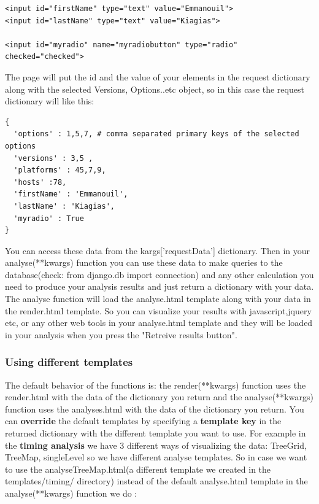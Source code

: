 \documentclass{lhcbnote}
\begin{document}
\begin{verbatim}
<input id="firstName" type="text" value="Emmanouil">
<input id="lastName" type="text" value="Kiagias">

<input id="myradio" name="myradiobutton" type="radio" checked="checked">
\end{verbatim}

The page will put the id and the value of your elements in the request dictionary along with the selected Versions, Options..etc object, so in this case the request dictionary will like this:

\begin{verbatim}
{
  'options' : 1,5,7, # comma separated primary keys of the selected options 
  'versions' : 3,5 , 
  'platforms' : 45,7,9,
  'hosts' :78,
  'firstName' : 'Emmanouil',
  'lastName' : 'Kiagias',
  'myradio' : True
} 
\end{verbatim} 

You can access these data from the kargs['requestData'] dictionary. Then in your analyse(**kwargs) function you can use these data to make queries to the database(check: from django.db import connection)
and any other calculation you need to produce your analysis results and just return a dictionary with your data. The analyse function will load the analyse.html template along with your data in the render.html template.
So you can visualize your results with javascript,jquery etc, or any other web tools in your analyse.html template and they will be loaded in your analysis when you press the "Retreive results button".

\subsubsection{Using different templates}

The default behavior of the functions is: the render(**kwargs) function uses the render.html with the data of the dictionary you return 
and the analyse(**kwargs) function uses the analyses.html with the data of the dictionary you return. You can {\bf override} the default templates by specifying
a {\bf template key} in the returned dictionary with the different template you want to use. For example in the {\bf timing analysis} we have 3 different ways of visualizing the data:
TreeGrid, TreeMap, singleLevel so we have different analyse templates. So in case we want to use the analyseTreeMap.html(a different template we created in the templates/timing/  directory)  instead
of the default analyse.html template  in the analyse(**kwargs) function we do :
\end{document}
